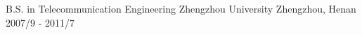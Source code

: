 

\begin{cventries}

  \cventry
    {B.S. in Telecommunication Engineering} %
    {Zhengzhou University} %
    {Zhengzhou, Henan} %
    {2007/9 - 2011/7} %
    {}

\end{cventries}
